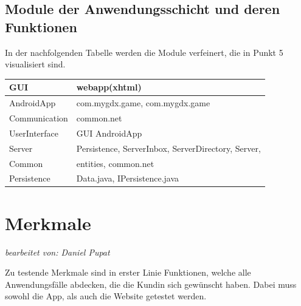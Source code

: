 \documentclass[fontsize=12pt,paper=a4,twoside]{scrartcl}
\begin{document}
\subsection{Module der Anwendungsschicht und deren Funktionen}
\label{mod-controller}

In der nachfolgenden Tabelle werden die Module verfeinert, die in Punkt 5 visualisiert sind.

\begin{tabular}{|l|p{12cm}|}
\hline
	GUI & webapp(xhtml)\\
\hline
	AndroidApp & com.mygdx.game, com.mygdx.game\\
\hline
	Communication & common.net\\
\hline
	UserInterface & GUI AndroidApp\\
\hline
	Server & Persistence, ServerInbox, ServerDirectory, Server, \\
\hline
	Common & entities, common.net\\
\hline
	Persistence & Data.java, IPersistence.java\\
\hline
\end{tabular}


\clearpage

\section{Merkmale}
\textit{bearbeitet von: Daniel Pupat }\\
\label{c04}

Zu testende Merkmale sind in erster Linie Funktionen, welche alle Anwendungsfälle abdecken, die die Kundin sich gewünscht haben. Dabei muss sowohl die App, als auch die Website getestet werden.\\
\end{document}
